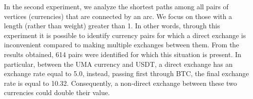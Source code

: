 In the second experiment, we analyze the shortest paths among all pairs of vertices (currencies) that are connected by an arc.
We focus on those with a length (rather than weight) greater than 1.
In other words, through this experiment it is possible to identify currency pairs for which a direct exchange is inconvenient compared to making multiple exchanges between them.
From the results obtained, 614 pairs were identified for which this situation is present. In particular, between the UMA currency and USDT, a direct exchange has an exchange rate equal to 5.0, instead, passing first through BTC, the final exchange rate is equal to 10.32. Consequently, a non-direct exchange between these two currencies could double their value.
